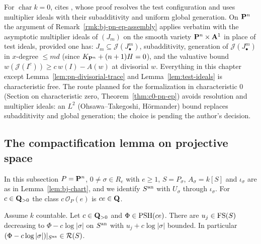 \begin{remark}\label{rmk:bj-char-zero}
For $\operatorname{char}k=0$, \cite[\S3]{FHX} cites \cite[Theorem~5.20]{BJ22}, whose proof resolves the test
configuration and uses multiplier ideals with their subadditivity and uniform global generation. On $\mathbf{P}^n$
the argument of Remark~\ref{rmk:bj-pn-ep-assembly} applies verbatim with the asymptotic multiplier ideals of
$(J_m)$ on the smooth variety $\mathbf{P}^n\times\mathbf{A}^1$ in place of test ideals, provided one has: $J_m\subseteq\mathcal
J(J_\bullet^m)$, subadditivity, generation of $\mathcal J(J_\bullet^m)$ in $x$-degree $\le md$ (since
$K_{\mathbf{P}^n}+(n+1)H=0$), and the valuative bound $w(\mathcal J(I^c))\ge c\,w(I)-A(w)$ at divisorial $w$. Everything
in this chapter except Lemma~\ref{lem:pn-divisorial-trace} and Lemma~\ref{lem:test-ideals} is
characteristic free. The route planned for the formalization in characteristic $0$ (Section on characteristic zero,
Theorem~\ref{thm:c0-pn-ep}) avoids resolution and multiplier ideals: an $L^2$ (Ohsawa--Takegoshi, H\"ormander)
bound replaces subadditivity and global generation; the choice is pending the author's decision.
\end{remark}

\subsection{The compactification lemma on projective space}

In this subsection $P=\mathbf{P}^n$, $0\ne\sigma\in R_e$ with $e\ge1$, $S=P_\sigma$, $A_\sigma=k[S]$ and
$\iota_\sigma$ are as in Lemma~\ref{lem:bj-chart}, and we identify $S^{\mathrm{an}}$ with $U_\sigma$ through
$\iota_\sigma$. For $c\in\mathbf{Q}_{>0}$ the class $c\,\mathcal O_P(e)$ is $ce\in\mathbf{Q}$.

\begin{lemma}\label{lem:bj-compactification-regularize}
\leanok
{}
Assume $k$ countable. Let $c\in\mathbf{Q}_{>0}$ and $\Phi\in\operatorname{PSH}(ce)$. There are $u_j\in\mathrm{FS}(S)$ decreasing to
$\Phi-c\log|\sigma|$ on $S^{\mathrm{an}}$ with $u_j+c\log|\sigma|$ bounded. In particular
$(\Phi-c\log|\sigma|)|_{S^{\mathrm{an}}}\in\mathcal{R}(S)$.
\end{lemma}

